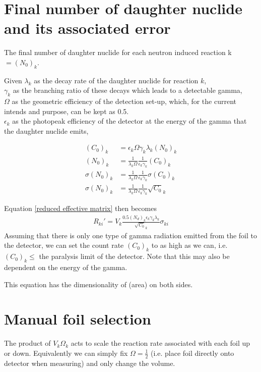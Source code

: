 \documentclass[a4paper, 12pt]{article}
\begin{document}
\section{Final number of daughter nuclide and its associated error}
The final number of daughter nuclide for each neutron induced reaction k $= (N_0)_k$.

Given $\lambda_k$ as the decay rate of the daughter nuclide for reaction $k$, \\
$\gamma_k$ as the branching ratio of these decays which leads to a detectable gamma,\\
$\Omega$ as the geometric efficiency of the detection set-up, which, for the current intends and purpose, can be kept as 0.5. \\
$\epsilon_k$ as the photopeak efficiency of the detector at the energy of the gamma that the daughter nuclide emits,

\begin{align}
    (C_0)_k &= \epsilon_{k} \Omega \gamma_{k} \lambda_k (N_0)_k\\
    (N_0)_k &= \frac{1}{\lambda_k \Omega} \frac{1}{\epsilon_{k} \gamma_{k}} (C_0)_k\\
    \sigma(N_0)_k &= \frac{1}{\lambda_k \Omega} \frac{1}{\epsilon_{k} \gamma_{k}} \sigma(C_0)_k\\
    \sigma(N_0)_k &= \frac{1}{\lambda_k \Omega} \frac{1}{\epsilon_{k} \gamma_{k}} \sqrt{C_0}_k \label{error on final number of nuclide}
\end{align}

Equation \ref{reduced effective matrix} then becomes
\begin{align}
    R_{ki}' = V_k \frac{0.5 (N_d)_k\epsilon_{k}\gamma_{k} \lambda_k }{\sqrt{C_0}_k} \sigma_{ki}
\end{align}
Assuming that there is only one type of gamma radiation emitted from the foil to the detector, we can set the count rate $(C_0)_k$ to as high as we can, i.e. $(C_0)_k \leq$ the paralysis limit of the detector. Note that this may also be dependent on the energy of the gamma.

This equation has the dimensionality of (area) on both sides.

\section{Manual foil selection}
The product of $V_k \Omega_k$ acts to scale the reaction rate associated with each foil up or down. Equivalently we can simply fix $\Omega=\frac{1}{2}$ (i.e. place foil directly onto detector when measuring) and only change the volume.
\end{document}

